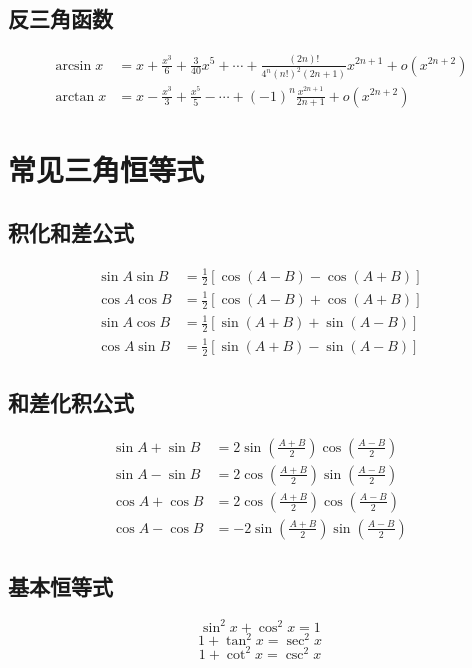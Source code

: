 \subsection*{反三角函数}
\begin{align*}
    \displaystyle \arcsin x &= \boxed{x + \frac{x^3}{6}} + \frac{3}{40}x^5 + \cdots + \frac{(2n)!}{4^n (n!)^2 (2n + 1)} x^{2n+1} + o(x^{2n+2}) \\
    \displaystyle \arctan x &= x - \frac{x^3}{3} + \frac{x^5}{5} - \cdots + (-1)^n \frac{x^{2n+1}}{2n+1} + o(x^{2n+2})
\end{align*}

\newpage
\section{常见三角恒等式}

\subsection*{积化和差公式}
\begin{align*}
    \sin A \sin B &= \frac{1}{2}[\cos(A - B) - \cos(A + B)] \\
    \cos A \cos B &= \frac{1}{2}[\cos(A - B) + \cos(A + B)] \\
    \sin A \cos B &= \frac{1}{2}[\sin(A + B) + \sin(A - B)] \\
    \cos A \sin B &= \frac{1}{2}[\sin(A + B) - \sin(A - B)]
\end{align*}

\subsection*{和差化积公式}
\begin{align*}
    \sin A + \sin B &= 2 \sin\left( \frac{A + B}{2} \right) \cos\left( \frac{A - B}{2} \right) \\
    \sin A - \sin B &= 2 \cos\left( \frac{A + B}{2} \right) \sin\left( \frac{A - B}{2} \right) \\
    \cos A + \cos B &= 2 \cos\left( \frac{A + B}{2} \right) \cos\left( \frac{A - B}{2} \right) \\
    \cos A - \cos B &= -2 \sin\left( \frac{A + B}{2} \right) \sin\left( \frac{A - B}{2} \right)
\end{align*}

\subsection*{基本恒等式}
\[
\sin^2 x + \cos^2 x = 1
\]
\[
1 + \tan^2 x = \sec^2 x
\]
\[
1 + \cot^2 x = \csc^2 x
\]

